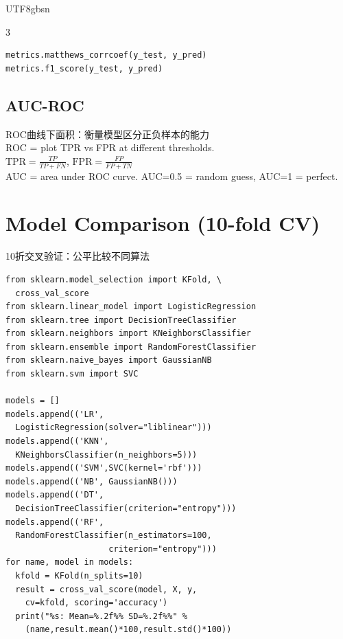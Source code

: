 \documentclass[9pt,landscape,a4paper]{article}
\newcommand{\zhint}[1]{{\scriptsize\color{gray!70!black}#1}}
\begin{document}
\begin{CJK}{UTF8}{gbsn}
\begin{multicols}{3}
\begin{lstlisting}
metrics.matthews_corrcoef(y_test, y_pred)
metrics.f1_score(y_test, y_pred)
\end{lstlisting}

\subsection{AUC-ROC}
\zhint{ROC曲线下面积：衡量模型区分正负样本的能力}\\
ROC = plot TPR vs FPR at different thresholds.\\
$\text{TPR} = \frac{TP}{TP+FN}$, \quad $\text{FPR} = \frac{FP}{FP+TN}$\\
AUC = area under ROC curve. AUC=0.5 = random guess, AUC=1 = perfect.

\section{Model Comparison (10-fold CV)}
\zhint{10折交叉验证：公平比较不同算法}

\begin{lstlisting}
from sklearn.model_selection import KFold, \
  cross_val_score
from sklearn.linear_model import LogisticRegression
from sklearn.tree import DecisionTreeClassifier
from sklearn.neighbors import KNeighborsClassifier
from sklearn.ensemble import RandomForestClassifier
from sklearn.naive_bayes import GaussianNB
from sklearn.svm import SVC

models = []
models.append(('LR',
  LogisticRegression(solver="liblinear")))
models.append(('KNN',
  KNeighborsClassifier(n_neighbors=5)))
models.append(('SVM',SVC(kernel='rbf')))
models.append(('NB', GaussianNB()))
models.append(('DT',
  DecisionTreeClassifier(criterion="entropy")))
models.append(('RF',
  RandomForestClassifier(n_estimators=100,
                     criterion="entropy")))
for name, model in models:
  kfold = KFold(n_splits=10)
  result = cross_val_score(model, X, y,
    cv=kfold, scoring='accuracy')
  print("%s: Mean=%.2f%% SD=%.2f%%" %
    (name,result.mean()*100,result.std()*100))
\end{lstlisting}


\end{multicols}
\end{CJK}
\end{document}
